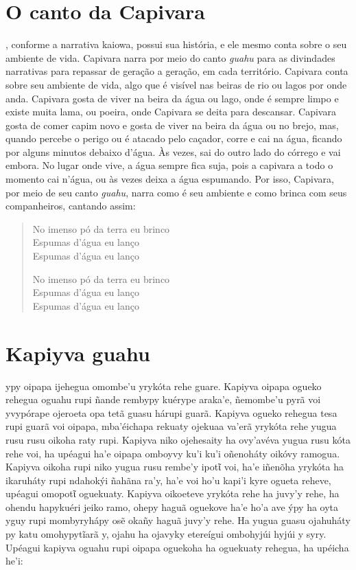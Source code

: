 \chapter{O canto da Capivara}

, conforme a narrativa kaiowa, possui sua história, e ele mesmo
conta sobre o seu ambiente de vida. Capivara narra por meio do canto
\textit{guahu} para as divindades narrativas para repassar de geração a
geração, em cada território. Capivara conta sobre seu ambiente de vida,
algo que é visível nas beiras de rio ou lagos por onde anda. Capivara
gosta de viver na beira da água ou lago, onde é sempre limpo e existe
muita lama, ou poeira, onde Capivara se deita para descansar. Capivara
gosta de comer capim novo e gosta de viver na beira da água ou no brejo,
mas, quando percebe o perigo ou é atacado pelo caçador, corre e cai na
água, ficando por alguns minutos debaixo d'água. Às vezes, sai do outro
lado do córrego e vai embora. No lugar onde vive, a água sempre fica
suja, pois a capivara a todo o momento cai n'água, ou às vezes deixa a
água espumando. Por isso, Capivara, por meio de seu canto \textit{guahu},
narra como é seu ambiente e como brinca com seus companheiros, cantando
assim:

\begin{verse}
No imenso pó da terra eu brinco\\
Espumas d'água eu lanço\\
Espumas d'água eu lanço

No imenso pó da terra eu brinco\\
Espumas d'água eu lanço\\
Espumas d'água eu lanço
\end{verse}

\chapter{Kapiyva guahu}

 ypy oipapa ijehegua omombe'u yrykóta rehe guare. Kapiyva oipapa
ogueko rehegua oguahu rupi ñande rembypy kuérype araka'e, ñemombe'u pyrã
voi yvypórape ojeroeta opa tetã guasu hárupi guarã. Kapiyva ogueko
rehegua tesa rupi guarã voi oipapa, mba'éichapa rekuaty ojekuaa va'erã
yrykóta rehe yugua rusu rusu oikoha raty rupi. Kapiyva niko ojehesaity
ha ovy'avéva yugua rusu kóta rehe voi, ha upéagui ha'e oipapa omboyvy
ku'i ku'i oñenoháty oikóvy ramogua. Kapiyva oikoha rupi niko yugua rusu
rembe'y ipotῖ voi, ha'e iñenõha yrykóta ha ikaruháty rupi ndahokýi
ñahãna ra'y, ha'e voi ho'u kapi'i kyre ogueta reheve, upéagui omopotῖ
oguekuaty. Kapiyva oikoeteve yrykóta rehe ha juvy'y rehe, ha ohendu
hapykuéri jeiko ramo, ohepy haguã oguekove ha'e ho'a ave ýpy ha oyta
yguy rupi mombyryhápy osẽ okañy haguã juvy'y rehe. Ha yugua guasu
ojahuháty py katu omohypytĩarã y, ojahu ha ojavyky etereígui ombohyjúi
hyjúi y syry. Upéagui kapiyva oguahu rupi oipapa oguekoha ha oguekuaty
rehegua, ha upéicha he'i:

